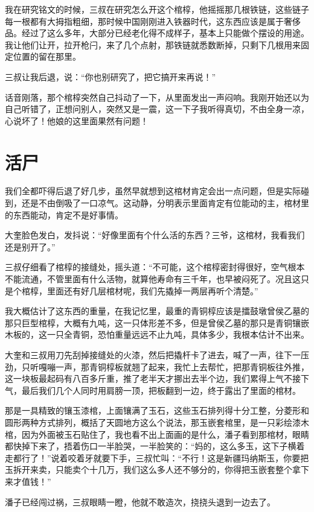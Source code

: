 我在研究铭文的时候，三叔在研究怎么开这个棺椁，他摇摇那几根铁链，这些链子每一根都有大拇指粗细，那时候中国刚刚进入铁器时代，这东西应该是属于奢侈品。经过了这么多年，大部分已经老化得不成样子，基本上只能做个摆设的用途。我让他们让开，拉开枪闩，来了几个点射，那铁链就悉数断掉，只剩下几根用来固定位置的留在那里。

三叔让我后退，说：“你也别研究了，把它搞开来再说！”

话音刚落，那个棺椁突然自己抖动了一下，从里面发出一声闷响。我刚开始还以为自己听错了，正想问别人，突然又是一震，这一下子我听得真切，不由全身一凉，心说坏了！他娘的这里面果然有问题！

\chapter{活尸}

我们全都吓得后退了好几步，虽然早就想到这棺材肯定会出一点问题，但是实际碰到，还是不由倒吸了一口凉气。这动静，分明表示里面肯定有位能动的主，棺材里的东西能动，肯定不是好事情。

大奎脸色发白，发抖说：“好像里面有个什么活的东西？三爷，这棺材，我看我们还是别开了。”

三叔仔细看了棺椁的接缝处，摇头道：“不可能，这个棺椁密封得很好，空气根本不能流通，不管里面有什么活物，就算他寿命有三千年，也早被闷死了。况且这只是个棺椁，里面还有好几层棺材呢，我们先撬掉一两层再听个清楚。”

我大概估计了这东西的重量，在我记忆里，最重的青铜椁应该是擂鼓墩曾侯乙墓的那只巨型棺椁，大概有九吨，这一只体形差不多，但是曾侯乙墓的那只是青铜镶嵌木板的，这一只全青铜，恐怕重量远远不止九吨，具体多少，我根本估计不出来。

大奎和三叔用刀先刮掉接缝处的火漆，然后把撬杆卡了进去，喊了一声，往下一压劲，只听嘎嘣一声，那青铜椁板就翘了起来，我忙上去帮忙，把那青铜板往外推，这一块板最起码有八百多斤重，推了老半天才挪出去半个边，我们累得上气不接下气，最后我们几个人同时用肩膀一顶，把板翻到一边，终于露出了里面的棺材。

那是一具精致的镶玉漆棺，上面镶满了玉石，这些玉石排列得十分工整，分菱形和圆形两种方式排列，概括了天圆地方这么个说法，那玉嵌套棺里，是一只彩绘漆木棺，因为外面被玉石贴住了，我也看不出上面画的是什么，潘子看到那棺材，眼睛都快掉下来了，捂着伤口一半脸哭，一半脸笑的：“妈的，这么多玉，这下子横着走都行了！”说着咬着牙就要下手，三叔忙叫：“不行！这是新疆玛纳斯玉，你要把玉拆开来卖，只能卖个十几万，我们这么多人还不够分的，你得把玉嵌套整个拿下来才值钱！”

潘子已经闯过祸，三叔眼睛一瞪，他就不敢造次，挠挠头退到一边去了。


